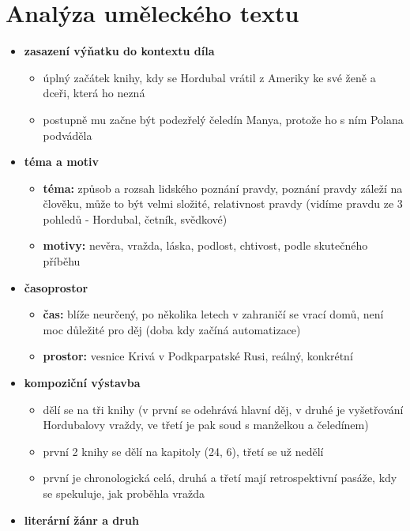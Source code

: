 \documentclass[11pt]{article}
\begin{document}
    \section*{Analýza uměleckého textu}
    \begin{itemize}
        \item\textbf{zasazení výňatku do kontextu díla}
        \begin{itemize}
            \item úplný začátek knihy, kdy se Hordubal vrátil z Ameriky ke své ženě a dceři, která ho nezná
            \item postupně mu začne být podezřelý čeledín Manya, protože ho s ním Polana podváděla
        \end{itemize}
        \item\textbf{téma a motiv}
        \begin{itemize}
            \item\textbf{téma: }způsob a rozsah lidského poznání pravdy, poznání pravdy záleží na člověku, může to být velmi složité, relativnost pravdy (vidíme pravdu ze 3 pohledů - Hordubal, četník, svědkové)
            \item\textbf{motivy: }nevěra, vražda, láska, podlost, chtivost, podle skutečného příběhu
        \end{itemize}
        \item\textbf{časoprostor}
        \begin{itemize}
            \item\textbf{čas: }blíže neurčený, po několika letech v zahraničí se vrací domů, není moc důležité pro děj (doba kdy začíná automatizace)
            \item\textbf{prostor: }vesnice Krivá v Podkparpatské Rusi, reálný, konkrétní
        \end{itemize}
        \item\textbf{kompoziční výstavba}
        \begin{itemize}
            \item dělí se na tři knihy (v první se odehrává hlavní děj, v druhé je vyšetřování Hordubalovy vraždy, ve třetí je pak soud s manželkou a čeledínem)
            \item první 2 knihy se dělí na kapitoly (24, 6), třetí se už nedělí
            \item první je chronologická celá, druhá a třetí mají retrospektivní pasáže, kdy se spekuluje, jak proběhla vražda
        \end{itemize}
        \item\textbf{literární žánr a druh}

\end{itemize}
\end{document}
